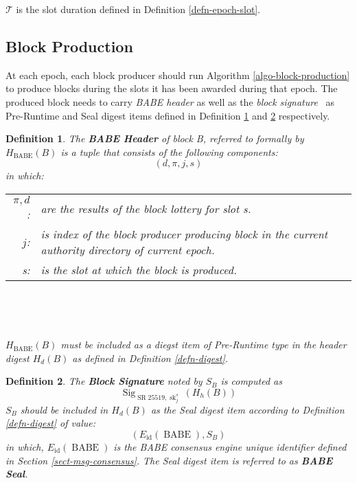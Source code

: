 \documentclass{book}
\newcommand{\tmem}[1]{{\em #1\/}}
\newcommand{\tmop}[1]{\ensuremath{\operatorname{#1}}}
\newcommand{\tmstrong}[1]{\textbf{#1}}
\newcommand{\tmtextbf}[1]{{\bfseries{#1}}}
\newcommand{\tmtextit}[1]{{\itshape{#1}}}
\newtheorem{definition}{Definition}
\providecommand{\tmem}[1]{\tmtextit{#1}}
\providecommand{\tmop}[1]{\ensuremath{\mathrm{#1}}}
\providecommand{\tmstrong}[1]{\tmtextbf{#1}}
\providecommand{\tmtextbf}[1]{\tmtextbf{#1}}
\providecommand{\tmtextit}[1]{\tmtextit{#1}}
\newtheorem{definition}{Definition}
\begin{document}
$\mathcal{T}$ is the slot duration defined in Definition
\ref{defn-epoch-slot}.

\subsection{Block Production}

At each epoch, each block producer should run Algorithm
\ref{algo-block-production} to produce blocks during the slots it has been
awarded during that epoch. The produced block needs to carry {\tmem{BABE
header}} as well as the {\tmem{block signature}} \ as Pre-Runtime and Seal
digest items defined in Definition \ref{defn-babe-header} and
\ref{defn-block-signature} respectively.

\begin{definition}
  The \label{defn-babe-header}{\tmstrong{BABE Header}} of block B, referred to
  formally by {\tmstrong{$H_{\tmop{BABE}} (B)$}} is a tuple that consists of
  the following components:
  \[ (d, \pi, j, s) \]
  in which:
  
  \begin{center}
    \begin{tabular}{rl}
      $\pi, d$: & are the results of the block lottery for slot s. \\
      $j$: & is index of the block producer producing block in the current
      authority directory of current epoch. \\
      s: & is the slot at which the block is produced.
    \end{tabular}
    
    \ 
  \end{center}
  
  \
  
  $H_{\tmop{BABE}} (B)$ must be included as a diegst item of Pre-Runtime type
  in the header digest $H_d (B)$ as defined in Definition \ref{defn-digest}. 
\end{definition}

\begin{definition}
  \label{defn-block-signature}\label{defn-babe-seal}The {\tmstrong{Block
  Signature}} noted by $S_B$ is computed as
  \[ \tmop{Sig}_{\tmop{SR} 25519, \tmop{sk}^s_j} (H_h (B)) \]
  $S_B$ should be included in $H_d (B)$ as the Seal digest item according to
  Definition \ref{defn-digest} of value:
  \[ (E_{\tmop{id}} (\tmop{BABE}), S_B) \]
  in which, $E_{\tmop{id}} (\tmop{BABE})$ is the BABE consensus engine unique
  identifier defined in Section \ref{sect-msg-consensus}. The Seal digest item
  is referred to as {\tmstrong{BABE Seal}}.
  
  \ 
\end{definition}
\end{document}
